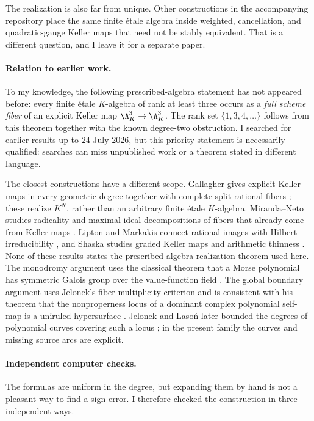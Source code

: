The realization is also far from unique.  Other constructions in the
accompanying repository place the same finite \'etale algebra inside weighted,
cancellation, and quadratic-gauge Keller maps that need not be stably
equivalent.  That is a different question, and I leave it for a separate
paper.

\paragraph{Relation to earlier work.}
To my knowledge, the following prescribed-algebra statement has not appeared
before: every finite \'etale $K$-algebra of rank at least three occurs as a
\emph{full scheme fiber} of an explicit Keller map $\A^3_K\to\A^3_K$.  The
rank set $\{1,3,4,\ldots\}$ follows from this theorem together with the known
degree-two obstruction.  I searched for earlier results up to 24 July 2026,
but this priority statement is necessarily qualified: searches can miss
unpublished work or a theorem stated in different language.

The closest constructions have a different scope.  Gallagher gives explicit
Keller maps in every geometric degree together with complete split rational
fibers \cite{Gallagher}; these realize $K^N$, rather than an arbitrary finite
\'etale $K$-algebra.  Miranda--Neto studies radicality and maximal-ideal
decompositions of fibers that already come from Keller maps \cite{Miranda}.
Lipton and Markakis connect rational images with Hilbert irreducibility
\cite{LiptonMarkakis}, and Shaska studies graded Keller maps and arithmetic
thinness \cite{Shaska}.  None of these results states the prescribed-algebra
realization theorem used here.  The monodromy argument uses the classical
theorem that a Morse polynomial has symmetric Galois group over the
value-function field \cite[Theorem~4.4.5]{Serre}.
The global boundary argument uses Jelonek's fiber-multiplicity criterion and
is consistent with his theorem that the nonproperness locus of a dominant
complex polynomial self-map is a uniruled hypersurface
\cite{Jelonek1993}.  Jelonek and Laso\'n later bounded the degrees of
polynomial curves covering such a locus \cite{JelonekLason}; in the present
family the curves and missing source arcs are explicit.

\paragraph{Independent computer checks.}
The formulas are uniform in the degree, but expanding them by hand is not a
pleasant way to find a sign error.  I therefore checked the construction in
three independent ways.


